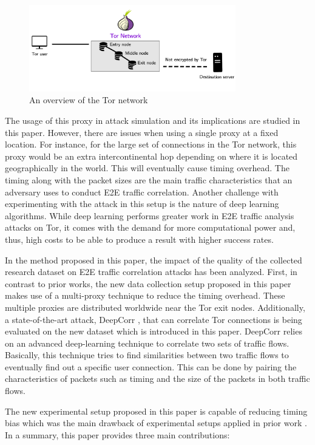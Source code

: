 \documentclass[sigconf]{acmart}
\begin{document}
\begin{figure}[h]
  \centering
  \includegraphics[width=9cm]{Figure_1.jpeg}
 \caption{\textmd{An overview of the Tor network}}
 \label{fig:1}
\end{figure}


The usage of this proxy in attack simulation and its implications are studied in this paper. However, there are issues when using a single proxy at a fixed location. For instance, for the large set of connections in the Tor network, this proxy would be an extra intercontinental hop depending on where it is located geographically in the world. This will eventually cause timing overhead. The timing along with the packet sizes are the main traffic characteristics that an adversary uses to conduct E2E traffic correlation. Another challenge with experimenting with the attack in this setup is the nature of deep learning algorithms. While deep learning performs greater work in E2E traffic analysis attacks on Tor, it comes with the demand for more computational power and, thus, high costs to be able to produce a result with higher success rates. 


In the method proposed in this paper, the impact of the quality of the collected research dataset on E2E traffic correlation attacks has been analyzed. First, in contrast to prior works, the new data collection setup proposed in this paper makes use of a multi-proxy technique to reduce the timing overhead. These multiple proxies are distributed worldwide near the Tor exit nodes. Additionally, a state-of-the-art attack, DeepCorr \cite{nasr2018deepcorr}, that can correlate Tor connections is being evaluated on the new dataset which is introduced in this paper. DeepCorr relies on an advanced deep-learning technique to correlate two sets of traffic flows. Basically, this technique tries to find similarities between two traffic flows to eventually find out a specific user connection. This can be done by pairing the characteristics of packets such as timing and the size of the packets in both traffic flows.

The new experimental setup proposed in this paper is capable of reducing timing bias which was the main drawback of experimental setups applied in prior work \cite{nasr2018deepcorr}. In a summary, this paper provides three  main contributions: 
\end{document}
